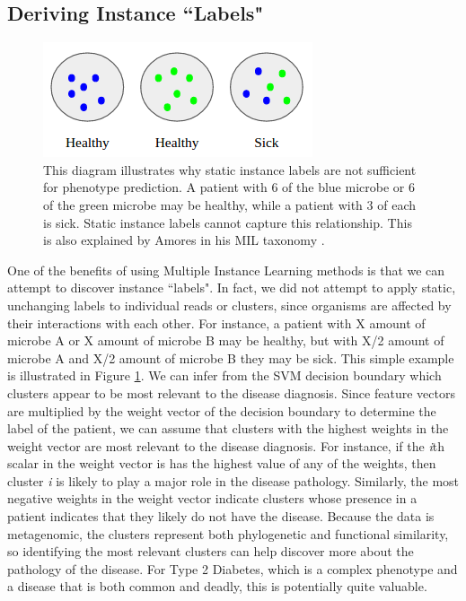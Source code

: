 \subsection{Deriving Instance ``Labels"}

\begin{figure}[t]
\centering
\includegraphics[scale=0.5]{./instance-labels.png}
\caption{This diagram illustrates why static instance labels are not sufficient for phenotype prediction. A patient with 6 of the blue microbe or 6 of the green microbe may be healthy, while a patient with 3 of each is sick. Static instance labels cannot capture this relationship. This is also explained by Amores in his MIL taxonomy \cite{amores13}.} \label{instance-labels}
\end{figure}

One of the benefits of using Multiple Instance Learning methods is that we can attempt to discover instance ``labels". In fact, we did not attempt to apply static, unchanging labels to individual reads or clusters, since organisms are affected by their interactions with each other. For instance, a patient with X amount of microbe A or X amount of microbe B may be healthy, but with X/2 amount of microbe A and X/2 amount of microbe B they may be sick. This simple example is illustrated in Figure \ref{instance-labels}. We can infer from the SVM decision boundary which clusters appear to be most relevant to the disease diagnosis. Since feature vectors are multiplied by the weight vector of the decision boundary to determine the label of the patient, we can assume that clusters with the highest weights in the weight vector are most relevant to the disease diagnosis. For instance, if the \emph{i}th scalar in the weight vector is has the highest value of any of the weights, then cluster \emph{i} is likely to play a major role in the disease pathology. Similarly, the most negative weights in the weight vector indicate clusters whose presence in a patient indicates that they likely do not have the disease. Because the data is metagenomic, the clusters represent both phylogenetic and functional similarity, so identifying the most relevant clusters can help discover more about the pathology of the disease. For Type 2 Diabetes, which is a complex phenotype and a disease that is both common and deadly, this is potentially quite valuable.